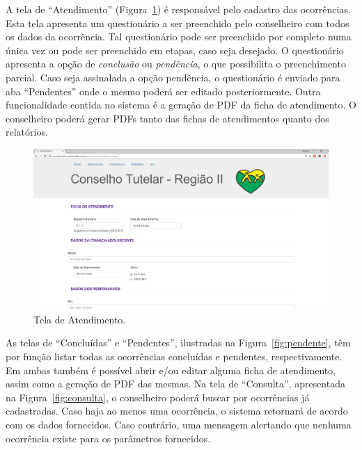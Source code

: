 \documentclass[12pt]{article}
\begin{document}
A tela de ``Atendimento'' (Figura~\ref{fig:atendimento}) é responsável pelo cadastro das ocorrências. Esta tela apresenta um questionário a ser preenchido pelo conselheiro com todos os dados da ocorrência. Tal questionário pode ser preenchido por completo numa única vez ou pode ser preenchido em etapas, caso seja desejado. O questionário apresenta a opção de \textit{conclusão} ou \textit{pendência}, o que possibilita o preenchimento parcial. Caso seja assinalada a opção pendência, o questionário é enviado para aba ``Pendentes'' onde o mesmo poderá ser editado posteriormente. Outra funcionalidade contida no sistema é a geração de PDF da ficha de atendimento. O conselheiro poderá gerar PDFs tanto das fichas de atendimentos quanto dos relatórios.

\begin{figure}[ht]
\centering
\includegraphics[width=.6\textwidth]{fig/4.png}
\caption{Tela de Atendimento.}
\label{fig:atendimento}
\end{figure}

As telas de ``Concluídas'' e ``Pendentes'', ilustradas na Figura~\ref{fig:pendente}, têm por função listar todas as ocorrências concluídas e pendentes, respectivamente. Em ambas também é possível abrir e/ou editar alguma ficha de atendimento, assim como a geração de PDF das mesmas. Na tela de ``Consulta'', apresentada na Figura~\ref{fig:consulta}, o conselheiro poderá buscar por ocorrências já cadastradas. Caso haja ao menos uma ocorrência, o sistema retornará de acordo com os dados fornecidos. Caso contrário, uma mensagem alertando que nenhuma ocorrência existe para os parâmetros fornecidos.
\end{document}
